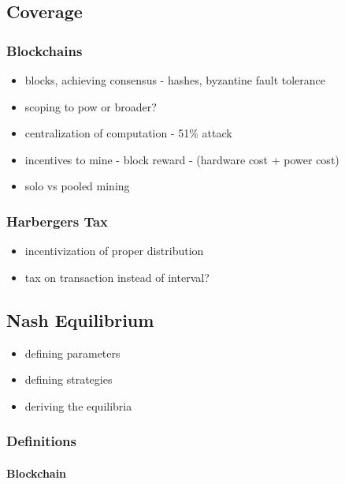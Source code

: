 \subsection{Coverage}

\subsubsection{Blockchains}

\begin{itemize}
  \item blocks, achieving consensus - hashes, byzantine fault tolerance
  \item scoping to pow or broader?
  \item centralization of computation - 51\% attack
  \item incentives to mine - block reward - (hardware cost + power cost)
  \item solo vs pooled mining
\end{itemize}

\subsubsection{Harbergers Tax}

\begin{itemize}
  \item incentivization of proper distribution
  \item tax on transaction instead of interval?
\end{itemize}

\subsection{Nash Equilibrium}

\begin{itemize}
  \item defining parameters
  \item defining strategies
  \item deriving the equilibria
\end{itemize}

\subsubsection{Definitions}

\paragraph{Blockchain}

